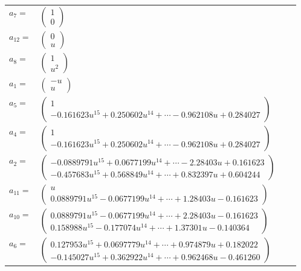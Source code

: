 \documentclass[1p]{elsarticle_modified}
\theoremstyle{definition}
\begin{document}
\begin{tabular}{m{7pt} m{180pt} m{7pt} m{180pt} }
\flushright $a_{7}=$&$\begin{pmatrix}1\\0\end{pmatrix}$ \\
\flushright $a_{12}=$&$\begin{pmatrix}0\\u\end{pmatrix}$ \\
\flushright $a_{8}=$&$\begin{pmatrix}1\\u^2\end{pmatrix}$ \\
\flushright $a_{1}=$&$\begin{pmatrix}- u\\u\end{pmatrix}$ \\
\flushright $a_{5}=$&$\begin{pmatrix}1\\-0.161623 u^{15}+0.250602 u^{14}+\cdots-0.962108 u+0.284027\end{pmatrix}$ \\
\flushright $a_{4}=$&$\begin{pmatrix}1\\-0.161623 u^{15}+0.250602 u^{14}+\cdots-0.962108 u+0.284027\end{pmatrix}$ \\
\flushright $a_{2}=$&$\begin{pmatrix}-0.0889791 u^{15}+0.0677199 u^{14}+\cdots-2.28403 u+0.161623\\-0.457683 u^{15}+0.568849 u^{14}+\cdots+0.832397 u+0.604244\end{pmatrix}$ \\
\flushright $a_{11}=$&$\begin{pmatrix}u\\0.0889791 u^{15}-0.0677199 u^{14}+\cdots+1.28403 u-0.161623\end{pmatrix}$ \\
\flushright $a_{10}=$&$\begin{pmatrix}0.0889791 u^{15}-0.0677199 u^{14}+\cdots+2.28403 u-0.161623\\0.158988 u^{15}-0.177074 u^{14}+\cdots+1.37301 u-0.140364\end{pmatrix}$ \\
\flushright $a_{6}=$&$\begin{pmatrix}0.127953 u^{15}+0.0697779 u^{14}+\cdots+0.974879 u+0.182022\\-0.145027 u^{15}+0.362922 u^{14}+\cdots+0.962468 u-0.461260\end{pmatrix}$ \\

\end{tabular}
\end{document}
